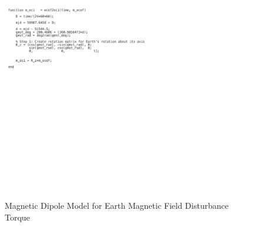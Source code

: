 \begin{figure}[H]
    \centering
    \captionsetup{justification = centering}
    \includegraphics[trim={0cm 15cm 10cm 0cm},clip,width = 15cm]{Images/PS5/magneticField-6.png}
    \caption{Magnetic Dipole Model for Earth Magnetic Field Disturbance Torque}
    \label{fig:simulink_mag}
\end{figure}